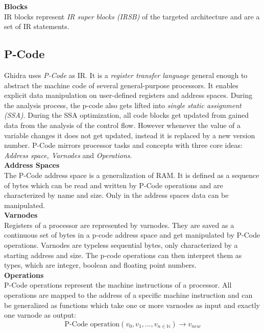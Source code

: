 \documentclass[seminar]{plai}
\begin{document}
\noindent\textbf{Blocks}\\
IR blocks represent \textit{IR super blocks (IRSB)} of the targeted architecture and are a set of IR statements.

\subsection{P-Code}
 Ghidra uses \textit{P-Code} as IR. It is a \textit{register transfer language} \cite{PCode-reference-manual} general enough to abstract the machine code of several general-purpose processors. It enables explicit data manipulation on user-defined registers and address spaces. During the analysis process, the p-code also gets lifted into \textit{single static assignment (SSA)}\cite{working-with-ghidras-pCode-to-identify-vulnerable-function-calls}. During the SSA optimization, all code blocks get updated from gained data from the analysis of the control flow. However whenever the value of a variable changes it does not get updated, instead it is replaced by a new version number.\cite{introduction-to-compilers-and-language-design}
P-Code mirrors processor tasks and concepts with three core ideas: \textit{Address space, Varnodes} and \textit{Operations}.\\

\noindent\textbf{Address Spaces}\\
The P-Code address space is a generalization of RAM.
It is defined as a sequence of bytes which can be read and written by P-Code operations and are characterized by name and size. Only in the address spaces data can be manipulated.\\

\noindent\textbf{Varnodes}\\
Registers of a processor are represented by varnodes. They are saved as a continuous set of bytes in a p-code address space and get manipulated by P-Code operations.
Varnodes are typeless sequential bytes, only characterized by a starting address and size. The p-code operations can then interpret them as types, which are integer, boolean and floating point numbers.\\

\noindent\textbf{Operations}\\
P-Code operations represent the machine instructions of a processor.
All operations are mapped to the address of a specific machine instruction and can be generalized as functions which take one or more varnodes as input and exactly one varnode as output:\cite{Pcode-reference-manual}
$$
\text{P-Code operation}(v_0,v_1,\dots,v_{n\in\mathbb N}) \rightarrow v_{new}
$$
\end{document}
